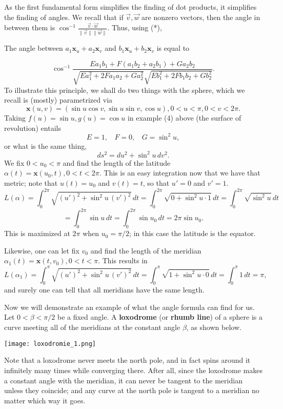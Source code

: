 \documentclass[leqno]{book}
\begin{document}
As the first fundamental form simplifies the finding of dot products, it simplifies the finding of angles.  We recall that if $\vec v,\vec w$ are nonzero vectors, then the angle in between them is $\cos^{-1}\frac{\vec v\cdot\vec w}{\|\vec v\|\|\vec w\|}$.  Thus, using (*),
\begin{center}
The angle between $a_1\mathbf x_u+a_2\mathbf x_v$ and $b_1\mathbf x_u+b_2\mathbf x_v$ is equal to
\end{center}
$$\cos^{-1}\frac{Ea_1b_1+F(a_1b_2+a_2b_1)+Ga_2b_2}{\sqrt{Ea_1^2+2Fa_1a_2+Ga_2^2}\sqrt{Eb_1^2+2Fb_1b_2+Gb_2^2}}.$$
To illustrate this principle, we shall do two things with the sphere, which we recall is (mostly) parametrized via
$$\mathbf x(u,v)=(\sin u\cos v,\sin u\sin v,\cos u),0<u<\pi,0<v<2\pi.$$
Taking $f(u)=\sin u,g(u)=\cos u$ in example (4) above (the surface of revolution) entails
\begin{equation}\tag{*}E=1,~~~~F=0,~~~~G=\sin^2u,\end{equation}
or what is the same thing,
$$ds^2=du^2+\sin^2u\,dv^2.$$
We fix $0<u_0<\pi$ and find the length of the latitude $\alpha(t)=\mathbf x(u_0,t),0<t<2\pi$.  This is an easy integration now that we have that metric; note that $u(t)=u_0$ and $v(t)=t$, so that $u'=0$ and $v'=1$.
$$L(\alpha)=\int_0^{2\pi}\sqrt{(u')^2+\sin^2u\,(v')^2}\,dt=\int_0^{2\pi}\sqrt{0+\sin^2u\cdot 1}\,dt=\int_0^{2\pi}\sqrt{\sin^2u}\,dt$$
$$=\int_0^{2\pi}\sin u\,dt=\int_0^{2\pi}\sin u_0\,dt=2\pi\sin u_0.$$
This is maximized at $2\pi$ when $u_0=\pi/2$; in this case the latitude is the equator.

Likewise, one can let fix $v_0$ and find the length of the meridian $\alpha_1(t)=\mathbf x(t,v_0),0<t<\pi$.  This results in
$$L(\alpha_1)=\int_0^\pi\sqrt{(u')^2+\sin^2u\,(v')^2}\,dt=\int_0^\pi\sqrt{1+\sin^2u\cdot 0}\,dt=\int_0^\pi 1\,dt=\pi,$$
and surely one can tell that all meridians have the same length.

Now we will demonstrate an example of what the angle formula can find for us.  Let $0<\beta<\pi/2$ be a fixed angle.  A \textbf{loxodrome} (or \textbf{rhumb line}) of a sphere is a curve meeting all of the meridians at the constant angle $\beta$, as shown below.
\begin{center}
\texttt{[image: loxodromie\_1.png]} %
\end{center}
Note that a loxodrome never meets the north pole, and in fact spins around it infinitely many times while converging there.  After all, since the loxodrome makes a constant angle with the meridian, it can never be tangent to the meridian unless they coincide; and any curve at the north pole is tangent to a meridian no matter which way it goes.
\end{document}
